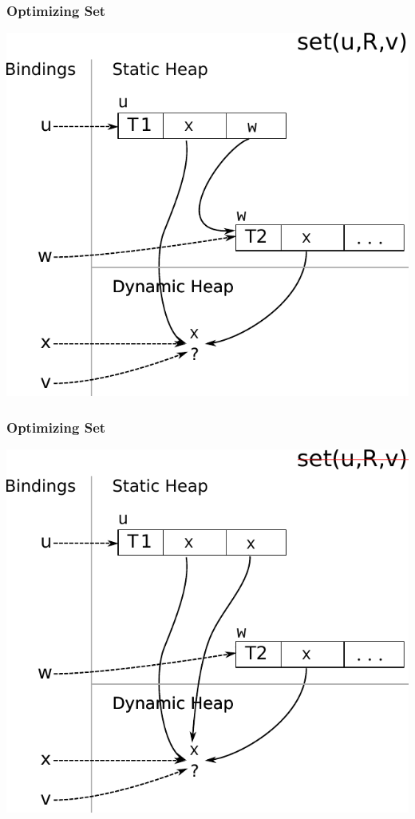\documentclass[utf8x]{beamer}
\begin{document}
\begin{frame}[plain]
  \frametitle{Optimizing Set}
  \includegraphics[scale=0.8]{figures/opt_set1}
\end{frame}

\begin{frame}[plain]
  \frametitle{Optimizing Set}
  \includegraphics[scale=0.8]{figures/opt_set2}
\end{frame}
\end{document}
